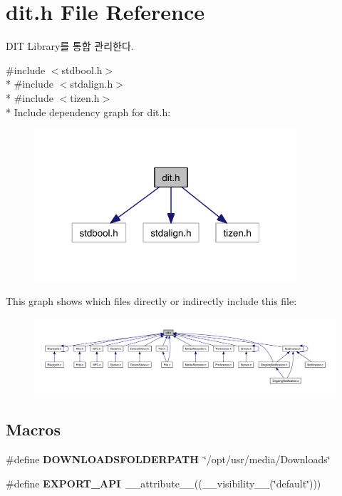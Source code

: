\section{dit.\-h File Reference}
\label{dit_8h}


D\-I\-T Library를 통합 관리한다.  


{\ttfamily \#include $<$stdbool.\-h$>$}\\*
{\ttfamily \#include $<$stdalign.\-h$>$}\\*
{\ttfamily \#include $<$tizen.\-h$>$}\\*
Include dependency graph for dit.\-h\-:\nopagebreak
\begin{figure}[H]
\begin{center}
\leavevmode
\includegraphics[width=276pt]{dit_8h__incl}
\end{center}
\end{figure}
This graph shows which files directly or indirectly include this file\-:\nopagebreak
\begin{figure}[H]
\begin{center}
\leavevmode
\includegraphics[width=350pt]{dit_8h__dep__incl}
\end{center}
\end{figure}
\subsection*{Macros}
\begin{DoxyCompactItemize}
\item 
\#define {\bfseries D\-O\-W\-N\-L\-O\-A\-D\-S\-F\-O\-L\-D\-E\-R\-P\-A\-T\-H}~\char`\"{}/opt/usr/media/Downloads\char`\"{}\label{dit_8h_af029412212bf6a445500174d743cdd20}

\item 
\#define {\bfseries E\-X\-P\-O\-R\-T\-\_\-\-A\-P\-I}~\-\_\-\-\_\-attribute\-\_\-\-\_\-((\-\_\-\-\_\-visibility\-\_\-\-\_\-(\char`\"{}default\char`\"{})))\label{dit_8h_a3536620a51a6fa45b41e6d9ff6fc4ad3}

\end{DoxyCompactItemize}
